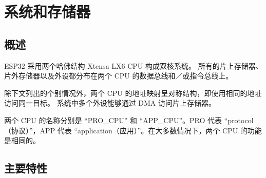 \documentclass[main\_\_CN.tex]{subfiles}
\begin{document}
\hypertarget{sysmem}{}
\chapter{系统和存储器}
\label{mod:sysmem}

\section{概述}

ESP32 采用两个哈佛结构 Xtensa LX6 CPU 构成双核系统。
所有的片上存储器、片外存储器以及外设都分布在两个 CPU 的数据总线和／或指令总线上。

除下文列出的个别情况外，两个 CPU 的地址映射呈对称结构，即使用相同的地址访问同一目标。
系统中多个外设能够通过 DMA 访问片上存储器。

两个 CPU 的名称分别是 “PRO\_CPU” 和 “APP\_CPU”。PRO 代表 “protocol（协议）”，APP 代表 “application（应用）”。在大多数情况下，两个 CPU 的功能是相同的。

\section{主要特性}
\end{document}
